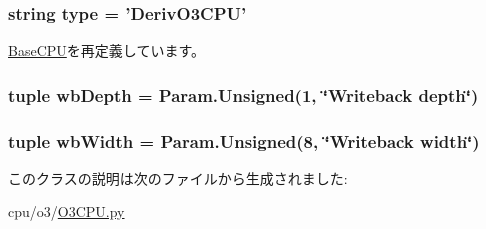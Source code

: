 \label{classO3CPU_1_1DerivO3CPU_a2c19f8ca9c4486b056283762263259bd}
\hypertarget{classO3CPU_1_1DerivO3CPU_acce15679d830831b0bbe8ebc2a60b2ca}{
\subsubsection[{type}]{\setlength{\rightskip}{0pt plus 5cm}string {\bf type} = '{\bf DerivO3CPU}'}}
\label{classO3CPU_1_1DerivO3CPU_acce15679d830831b0bbe8ebc2a60b2ca}


\hyperlink{classBaseCPU_1_1BaseCPU_acce15679d830831b0bbe8ebc2a60b2ca}{BaseCPU}を再定義しています。\hypertarget{classO3CPU_1_1DerivO3CPU_ac88ce0b2118b9b2687a490fd150a228b}{
\subsubsection[{wbDepth}]{\setlength{\rightskip}{0pt plus 5cm}tuple {\bf wbDepth} = Param.Unsigned(1, \char`\"{}Writeback depth\char`\"{})}}
\label{classO3CPU_1_1DerivO3CPU_ac88ce0b2118b9b2687a490fd150a228b}
\hypertarget{classO3CPU_1_1DerivO3CPU_a35ee0eb859fedb522c629bc7d435b5e4}{
\subsubsection[{wbWidth}]{\setlength{\rightskip}{0pt plus 5cm}tuple {\bf wbWidth} = Param.Unsigned(8, \char`\"{}Writeback width\char`\"{})}}
\label{classO3CPU_1_1DerivO3CPU_a35ee0eb859fedb522c629bc7d435b5e4}


このクラスの説明は次のファイルから生成されました:\begin{DoxyCompactItemize}
\item 
cpu/o3/\hyperlink{O3CPU_8py}{O3CPU.py}\end{DoxyCompactItemize}
